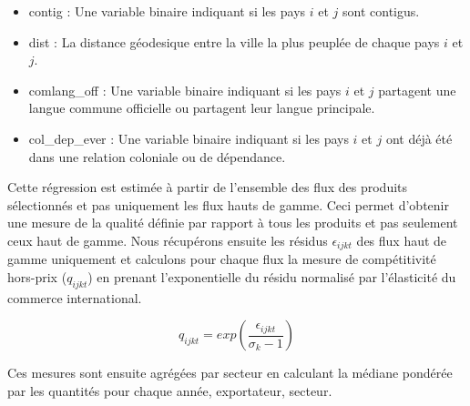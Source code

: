 \documentclass[french,10pt,a4paper]{article}
\begin{document}
\begin{itemize}
  \item contig : Une variable binaire indiquant si les pays $i$ et $j$ sont contigus.
  \item dist : La distance géodesique entre la ville la plus peuplée de chaque pays $i$ et $j$.
  \item comlang\_off : Une variable binaire indiquant si les pays $i$ et $j$ partagent une langue commune officielle ou partagent leur langue principale. 
  \item col\_dep\_ever : Une variable binaire indiquant si les pays $i$ et $j$ ont déjà été dans une relation coloniale ou de dépendance. 
\end{itemize}

\bigskip

Cette régression est estimée à partir de l'ensemble des flux des produits sélectionnés et pas uniquement les flux hauts de gamme. Ceci permet d'obtenir une mesure de la qualité définie par rapport à tous les produits et pas seulement ceux haut de gamme. Nous récupérons ensuite les résidus $\epsilon_{ijkt}$ des flux haut de gamme uniquement et calculons pour chaque flux la mesure de compétitivité hors-prix ($q_{ijkt}$) en prenant l'exponentielle du résidu normalisé par l'élasticité du commerce international. 

\begin{equation}
\label{eq:3}
q_{ijkt} = exp \left( \frac{\epsilon_{ijkt}}{\sigma_k - 1} \right)
\end{equation}

Ces mesures sont ensuite agrégées par secteur en calculant la médiane pondérée par les quantités pour chaque année, exportateur, secteur. 






\newpage

% 


\end{document}
